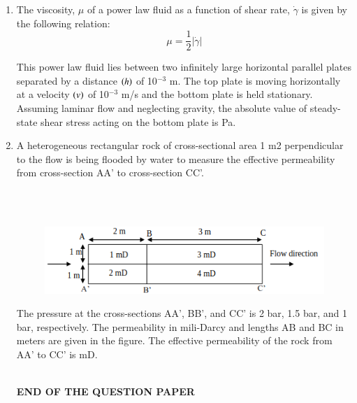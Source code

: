 \documentclass[journal,12pt,onecolumn]{IEEEtran}
\theoremstyle{remark}
\begin{document}
\begin{enumerate}
\hfill{}

\item The viscosity, $\mu$  of a power law fluid as a function of shear rate, $\dot{\gamma}$  is given by the following relation: 
\[ \mu = \frac{1}{2} |\dot{\gamma}| \]

This power law fluid lies between two infinitely large horizontal parallel plates separated by a distance $\left(h\right)$ of 10$^{-3}$ m. The top plate is moving horizontally at a velocity $\left(v\right)$ of 10$^{-3}$ m/s and the bottom plate is held stationary. Assuming laminar flow and neglecting gravity, the absolute value of steady-state shear stress acting on the bottom plate is \underline{\hspace{2cm}} Pa.  

\hfill{}

\item A heterogeneous rectangular rock of cross-sectional area 1 m2 perpendicular to the flow is
being flooded by water to measure the effective permeability from cross-section AA' to
cross-section CC'.

\hfill{}\\\\

\begin{figure}[h!]
  \centering
  \includegraphics[width=0.8\columnwidth]{figs/pic12.png} 
\end{figure}

The pressure at the cross-sections AA', BB', and CC' is 2 bar, 1.5 bar, and 1 bar,
respectively. The permeability in mili-Darcy and lengths AB and BC in meters are given in
the figure. The effective permeability of the rock from AA' to CC' is \underline{\hspace{4cm}}mD. 
\\\\

\vspace{6cm}

\begin{center}
	{\LARGE \textbf{END OF THE QUESTION PAPER}}
\end{center}

\end{enumerate}
\end{document}
